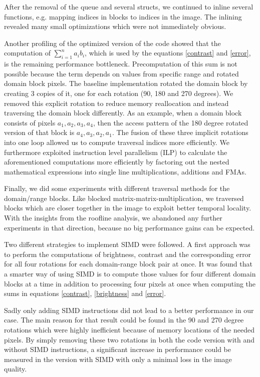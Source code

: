After the removal of the queue and several structs, we continued to inline several functions, e.g. mapping indices in blocks
to indices in the image. The inlining revealed many small optimizations which were not immediately obvious.

Another profiling of the optimized version of the code showed that the computation of $\sum_{i=1}^n a_i b_i$, which is used by the equations
\ref{contrast} and \ref{error}, is the remaining performance bottleneck. Precomputation of this sum is not possible
because the term depends on values from specific range and rotated domain block pixels. The baseline implementation rotated
the domain block by creating 3 copies of it, one for each rotation (90, 180 and 270 degrees). We removed this explicit rotation
to reduce memory reallocation and instead traversing the domain block differently. As an example, when a domain block consists
of pixels $a_1, a_2, a_3, a_4$, then the access pattern of the 180 degree rotated version of that block is $a_4, a_3, a_2, a_1$.
The fusion of these three implicit rotations into one loop allowed us to compute traversal indices more efficiently.
We furthermore exploited instruction level parallelism (ILP) to calculate the aforementioned computations more efficiently
by factoring out the nested mathematical expressions into single line multiplications, additions and FMAs.

Finally, we did some experiments with different traversal methods for the domain/range blocks. Like blocked matrix-matrix-multiplication,
we traversed blocks which are closer together in the image to exploit better temporal locality.
With the insights from the roofline analysis, we abandoned any further experiments in that direction, because no big performance
gains can be expected.

 Two different strategies to implement SIMD were
followed. A first approach was to perform the computations of brightness,
contrast and the corresponding error for all four rotations for each
domain-range block pair at once. It was found that a smarter way of using SIMD
is to compute those values for four different domain blocks at a time in
addition to processing four pixels at once when computing the sums in equations
\ref{contrast}, \ref{brightness} and \ref{error}.

Sadly only adding SIMD instructions did not lead to a better performance in our
case. The main reason for that result could be found in the 90 and 270 degree
rotations which were highly inefficient because of memory locations of the
needed pixels. By simply removing these two rotations in both the code version
with and without SIMD instructions, a significant increase in performance could
be measured in the version with SIMD with only a minimal loss in the image
quality.

